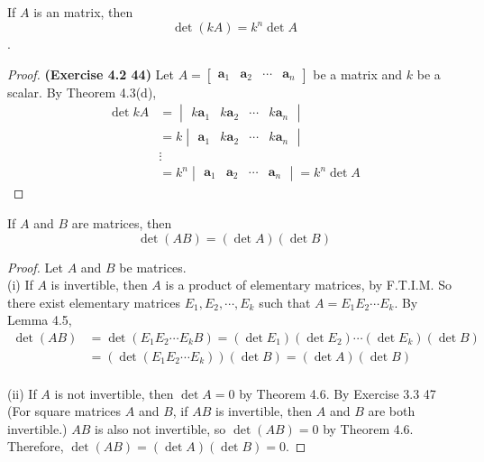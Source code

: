 \begin{theorem}
	If $ A $ is an \nbyn matrix, then $$ \det(kA) = k^{n}\det A $$.
\end{theorem}
\begin{proof}
	\textbf{(Exercise 4.2 44)} Let $A = \begin{bmatrix}
		\textbf{a}_1 & \textbf{a}_2 & \cdots & \textbf{a}_n
	\end{bmatrix}$ be a \nbyn matrix and $k$ be a scalar. By Theorem 4.3(d),
	\begin{align*}
		\det{kA} &= \begin{vmatrix}
			k\textbf{a}_1 & k\textbf{a}_2 & \cdots & k\textbf{a}_n
		\end{vmatrix} \\
		&= k\begin{vmatrix}
			\textbf{a}_1 & k\textbf{a}_2 & \cdots & k\textbf{a}_n
		\end{vmatrix} \\
		& \vdots \\
		&= k^n\begin{vmatrix}
			\textbf{a}_1 & \textbf{a}_2 & \cdots & \textbf{a}_n
		\end{vmatrix} = k^n\det{A}
	\end{align*}
\end{proof}

\begin{theorem}
	If $ A $ and $ B $ are \nbyn matrices, then $$ \det (AB) = \left(\det A\right)\left(\det B\right) $$
\end{theorem}
\begin{proof}
	Let $A$ and $B$ be \nbyn matrices. \\
	
	(i) If $A$ is invertible, then $A$ is a product of elementary matrices, by F.T.I.M. So there exist elementary matrices $E_1, E_2, \cdots, E_k$ such that $A = E_1E_2\cdots E_k$. By Lemma 4.5,
	\begin{align*}
		\det{(AB)} &= \det{(E_1E_2\cdots E_kB)} = (\det{E_1})(\det{E_2})\cdots(\det{E_k})(\det{B}) \\
		&= (\det{(E_1E_2\cdots E_k)})(\det{B}) = (\det{A})(\det{B})
	\end{align*} \\
	
	(ii) If $A$ is not invertible, then $\det{A} = 0$ by Theorem 4.6. By Exercise 3.3 47 (For square matrices $A$ and $B$, if $AB$ is invertible, then $A$ and $B$ are both invertible.) $AB$ is also not invertible, so $\det{(AB)} = 0$ by Theorem 4.6. Therefore, $\det{(AB)} = (\det{A})(\det{B}) = 0$.
\end{proof}

